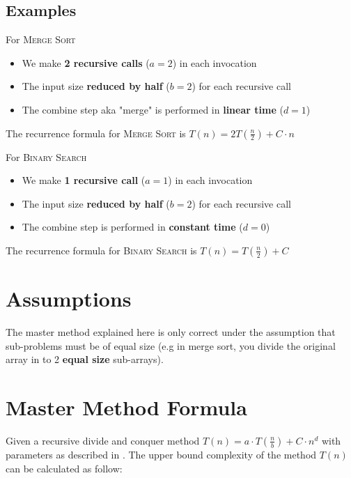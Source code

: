 \documentclass{article}
\begin{document}
\subsection{Examples}

\noindent For \textsc{Merge Sort}

\begin{itemize}[label={}]
    \item We make \textbf{2 recursive calls} ($a=2$) in each invocation
    \item The input size \textbf{reduced by half} ($b=2$) for each recursive call
    \item The combine step aka "merge" is performed in \textbf{linear time} ($d = 1$)
\end{itemize}

\noindent The recurrence formula for \textsc{Merge Sort} is $T(n) = 2T(\frac{n}{2}) + C \cdot n$

\bigskip

\noindent For \textsc{Binary Search}

\begin{itemize}[label={}]
    \item We make \textbf{1 recursive call} ($a=1$) in each invocation
    \item The input size \textbf{reduced by half} ($b=2$) for each recursive call
    \item The combine step is performed in \textbf{constant time} ($d = 0$)
\end{itemize}

\noindent The recurrence formula for \textsc{Binary Search} is $T(n) = T(\frac{n}{2}) + C$

\section{Assumptions}

The master method explained here is only correct under the assumption that sub-problems must be of equal size (e.g in merge sort, you divide the original array in to 2 \textbf{equal size} sub-arrays).

\section{Master Method Formula} \label{Master Method Formula}

Given a recursive divide and conquer method $T(n) = a \cdot T(\frac{n}{b}) + C \cdot n^d$ with parameters as described in . The upper bound complexity of the method $T(n)$ can be calculated as follow:
\end{document}
